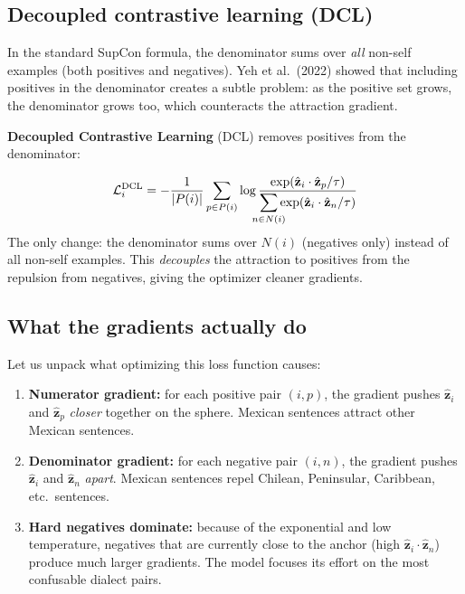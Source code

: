 \documentclass[11pt,a4paper]{article}
\theoremstyle{definition}
\begin{document}
\subsection{Decoupled contrastive learning (DCL)}

In the standard SupCon formula, the denominator sums over
\emph{all} non-self examples (both positives and negatives). Yeh
et al.\ (2022) showed that including positives in the denominator
creates a subtle problem: as the positive set grows, the denominator
grows too, which counteracts the attraction gradient.

\textbf{Decoupled Contrastive Learning} (DCL) removes positives from
the denominator:

\begin{mathbox}
\[
\mathcal{L}_i^{\text{DCL}} = -\frac{1}{|P(i)|}
\sum_{p \in P(i)}
\log \frac{
  \exp(\hat{\mathbf{z}}_i \cdot \hat{\mathbf{z}}_p / \tau)
}{
  \displaystyle\sum_{\mathclap{n \in N(i)}}
  \exp(\hat{\mathbf{z}}_i \cdot \hat{\mathbf{z}}_n / \tau)
}
\]
The only change: the denominator sums over $N(i)$ (negatives only)
instead of all non-self examples. This \emph{decouples} the
attraction to positives from the repulsion from negatives, giving the
optimizer cleaner gradients.
\end{mathbox}

\subsection{What the gradients actually do}

Let us unpack what optimizing this loss function causes:

\begin{enumerate}
\item \textbf{Numerator gradient:} for each positive pair $(i, p)$,
  the gradient pushes $\hat{\mathbf{z}}_i$ and $\hat{\mathbf{z}}_p$
  \emph{closer} together on the sphere. Mexican sentences attract
  other Mexican sentences.

\item \textbf{Denominator gradient:} for each negative pair $(i, n)$,
  the gradient pushes $\hat{\mathbf{z}}_i$ and $\hat{\mathbf{z}}_n$
  \emph{apart}. Mexican sentences repel Chilean, Peninsular,
  Caribbean, etc.\ sentences.

\item \textbf{Hard negatives dominate:} because of the exponential
  and low temperature, negatives that are currently close to the
  anchor (high $\hat{\mathbf{z}}_i \cdot \hat{\mathbf{z}}_n$) produce
  much larger gradients. The model focuses its effort on the most
  confusable dialect pairs.
\end{enumerate}
\end{document}
